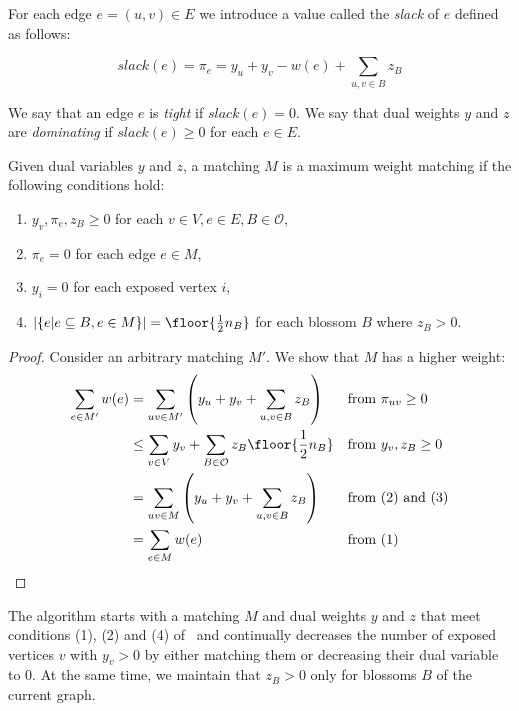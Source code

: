 \begin{defn}[slack]
    For each edge $e = (u, v) \in E$ we introduce a value called the \emph{slack} of $e$ defined as follows:

    \[slack(e) = \pi_e = y_u + y_v - w(e) + \sum_{u, v \in B} z_B\]
\end{defn}

We say that an edge $e$ is \emph{tight} if $slack(e) = 0$. We say that dual weights $y$ and $z$ are \emph{dominating} if $slack(e) \geq 0$ for each $e \in E$.

\begin{theorem}\label{thm:conditions}
Given dual variables $y$ and $z$, a matching $M$ is a maximum weight matching if the following conditions hold:

\begin{enumerate}
    \item $y_v, \pi_{e}, z_B \geq 0$ for each $v \in V, e \in E, B \in \mathcal{O}$,
    \item $\pi_{e} = 0$ for each edge $e \in M$,
    \item $y_i = 0$ for each exposed vertex $i$,
    \item $|\{e | e \subseteq B, e \in M\}| = \floor{\frac{1}{2}n_B}$ for each blossom $B$ where $z_B > 0$.
\end{enumerate}

\begin{proof}
Consider an arbitrary matching $M'$. We show that $M$ has a higher weight:
\begin{align*}
    \sum_{e \in M'} w(e) &= \sum_{uv \in M'} \left( y_u + y_v + \sum_{u, v \in B} z_B \right) && \text{from } \pi_{uv} \geq 0 \\
    &\leq \sum_{v \in V} y_v + \sum_{B \in \mathcal{O}} z_B\floor{\frac{1}{2}n_B} && \text{from } y_v, z_B \geq 0 \\
    &= \sum_{uv \in M} \left( y_u + y_v + \sum_{u, v \in B} z_B \right) && \text{from (2) and (3)}\\
    &= \sum_{e \in M} w(e) && \text{from (1)}\\
\end{align*}
\end{proof}

\end{theorem}

The algorithm starts with a matching $M$ and dual weights $y$ and $z$ that meet conditions (1), (2) and (4) of~ and continually decreases the number of exposed vertices $v$ with $y_v > 0$ by either matching them or decreasing their dual variable to $0$. At the same time, we maintain that $z_B > 0$ only for blossoms $B$ of the current graph.

